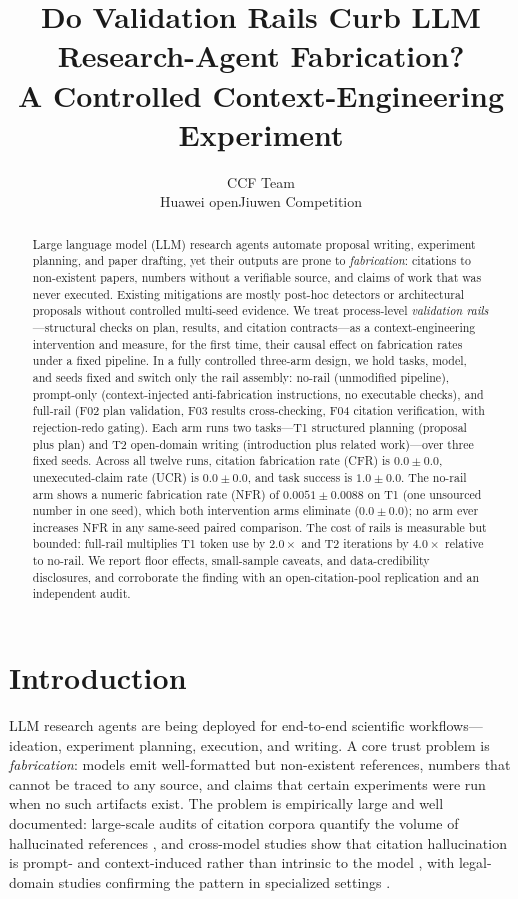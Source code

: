 \documentclass[10pt,twocolumn]{article}
\title{Do Validation Rails Curb LLM Research-Agent Fabrication?\\ A Controlled Context-Engineering Experiment}
\author{CCF Team\\ Huawei openJiuwen Competition}
\date{}
\begin{document}
\maketitle

\begin{abstract}
Large language model (LLM) research agents automate proposal writing, experiment planning, and paper drafting, yet their outputs are prone to \emph{fabrication}: citations to non-existent papers, numbers without a verifiable source, and claims of work that was never executed. Existing mitigations are mostly post-hoc detectors or architectural proposals without controlled multi-seed evidence. We treat process-level \emph{validation rails}---structural checks on plan, results, and citation contracts---as a context-engineering intervention and measure, for the first time, their causal effect on fabrication rates under a fixed pipeline. In a fully controlled three-arm design, we hold tasks, model, and seeds fixed and switch only the rail assembly: no-rail (unmodified pipeline), prompt-only (context-injected anti-fabrication instructions, no executable checks), and full-rail (F02 plan validation, F03 results cross-checking, F04 citation verification, with rejection-redo gating). Each arm runs two tasks---T1 structured planning (proposal plus plan) and T2 open-domain writing (introduction plus related work)---over three fixed seeds. Across all twelve runs, citation fabrication rate (CFR) is $0.0 \pm 0.0$, unexecuted-claim rate (UCR) is $0.0 \pm 0.0$, and task success is $1.0 \pm 0.0$. The no-rail arm shows a numeric fabrication rate (NFR) of $0.0051 \pm 0.0088$ on T1 (one unsourced number in one seed), which both intervention arms eliminate ($0.0 \pm 0.0$); no arm ever increases NFR in any same-seed paired comparison. The cost of rails is measurable but bounded: full-rail multiplies T1 token use by $2.0\times$ and T2 iterations by $4.0\times$ relative to no-rail. We report floor effects, small-sample caveats, and data-credibility disclosures, and corroborate the finding with an open-citation-pool replication and an independent audit.
\end{abstract}

\section{Introduction}
\label{sec:intro}

LLM research agents are being deployed for end-to-end scientific workflows---ideation, experiment planning, execution, and writing. A core trust problem is \emph{fabrication}: models emit well-formatted but non-existent references, numbers that cannot be traced to any source, and claims that certain experiments were run when no such artifacts exist. The problem is empirically large and well documented: large-scale audits of citation corpora quantify the volume of hallucinated references \citep{zhao2026wildhallucinations}, and cross-model studies show that citation hallucination is prompt- and context-induced rather than intrinsic to the model \citep{naser2026howllmscite}, with legal-domain studies confirming the pattern in specialized settings \citep{alrajeh2026legalcitations}.
\end{document}
